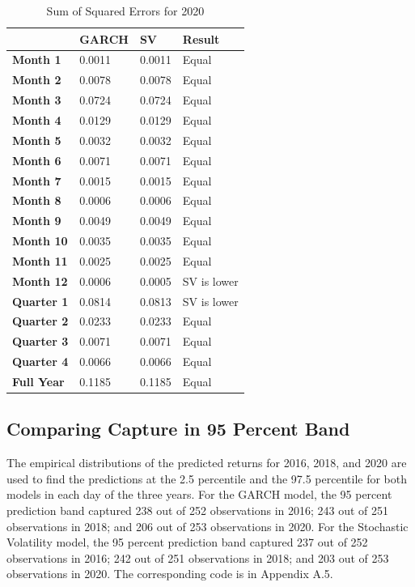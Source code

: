 \documentclass[12pt,letterpaper,reqno,fleqn]{article}
\begin{document}
\begin{table}[!ht]
    \centering
    \begin{tabular}{|l|l|l|l|}
    \hline
        ~ & \textbf{GARCH} & \textbf{SV} & \textbf{Result} \\ \hline
        \textbf{Month 1} & 0.0011 & 0.0011 & Equal \\ \hline
        \textbf{Month 2} & 0.0078 & 0.0078 & Equal \\ \hline
        \textbf{Month 3} & 0.0724 & 0.0724 & Equal \\ \hline
        \textbf{Month 4} & 0.0129 & 0.0129 & Equal \\ \hline
        \textbf{Month 5} & 0.0032 & 0.0032 & Equal \\ \hline
        \textbf{Month 6} & 0.0071 & 0.0071 & Equal \\ \hline
        \textbf{Month 7} & 0.0015 & 0.0015 & Equal \\ \hline
        \textbf{Month 8} & 0.0006 & 0.0006 & Equal \\ \hline
        \textbf{Month 9} & 0.0049 & 0.0049 & Equal \\ \hline
        \textbf{Month 10} & 0.0035 & 0.0035 & Equal \\ \hline
        \textbf{Month 11} & 0.0025 & 0.0025 & Equal \\ \hline
        \textbf{Month 12} & 0.0006 & 0.0005 & SV is lower \\ \hline
        \textbf{Quarter 1} & 0.0814 & 0.0813 & SV is lower \\ \hline
        \textbf{Quarter 2} & 0.0233 & 0.0233 & Equal \\ \hline
        \textbf{Quarter 3} & 0.0071 & 0.0071 & Equal \\ \hline
        \textbf{Quarter 4} & 0.0066 & 0.0066 & Equal \\ \hline
        \textbf{Full Year} & 0.1185 & 0.1185 & Equal \\ \hline
    \end{tabular}
\caption{Sum of Squared Errors for 2020}
\end{table}

\newpage
\subsection{Comparing Capture in 95 Percent Band}
The empirical distributions of the predicted returns for 2016, 2018, and 2020 are used to find the predictions at the 2.5 percentile and the 97.5 percentile for both models in each day of the three years. For the GARCH model, the 95 percent prediction band captured 238 out of 252 observations in 2016; 243 out of 251 observations in 2018; and 206 out of 253 observations in 2020. 
For the Stochastic Volatility model, the 95 percent prediction band captured 237 out of 252 observations in 2016; 242 out of 251 observations in 2018; and 203 out of 253 observations in 2020. The corresponding code is in Appendix A.5.
\end{document}
